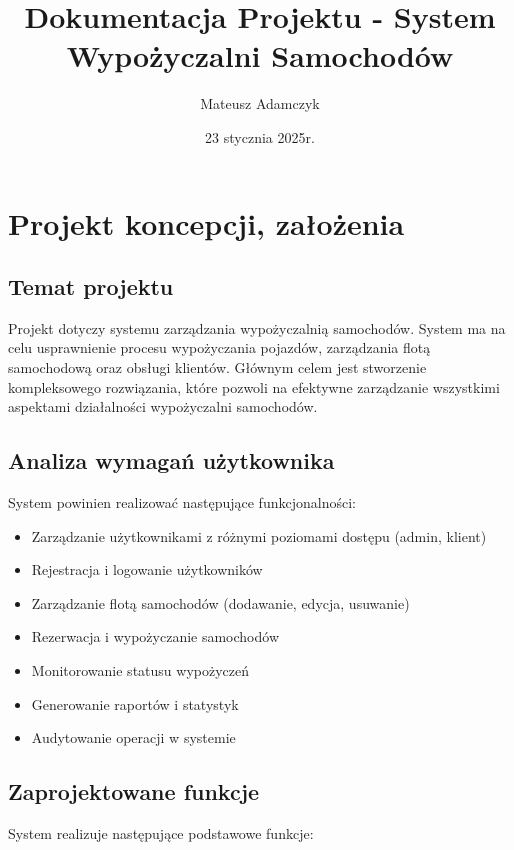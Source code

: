 \documentclass[12pt]{article}
\title{Dokumentacja Projektu - System Wypożyczalni Samochodów}
\author{Mateusz Adamczyk}
\date{23 stycznia 2025r.}
\begin{document}
\maketitle
\tableofcontents
\newpage

\section{Projekt koncepcji, założenia}

\subsection{Temat projektu}
Projekt dotyczy systemu zarządzania wypożyczalnią samochodów. System ma na celu usprawnienie procesu wypożyczania pojazdów, zarządzania flotą samochodową oraz obsługi klientów. Głównym celem jest stworzenie kompleksowego rozwiązania, które pozwoli na efektywne zarządzanie wszystkimi aspektami działalności wypożyczalni samochodów.

\subsection{Analiza wymagań użytkownika}
System powinien realizować następujące funkcjonalności:

\begin{itemize}
    \item Zarządzanie użytkownikami z różnymi poziomami dostępu (admin, klient)
    \item Rejestracja i logowanie użytkowników
    \item Zarządzanie flotą samochodów (dodawanie, edycja, usuwanie)
    \item Rezerwacja i wypożyczanie samochodów
    \item Monitorowanie statusu wypożyczeń
    \item Generowanie raportów i statystyk
    \item Audytowanie operacji w systemie
\end{itemize}

\subsection{Zaprojektowane funkcje}
System realizuje następujące podstawowe funkcje:
\end{document}
